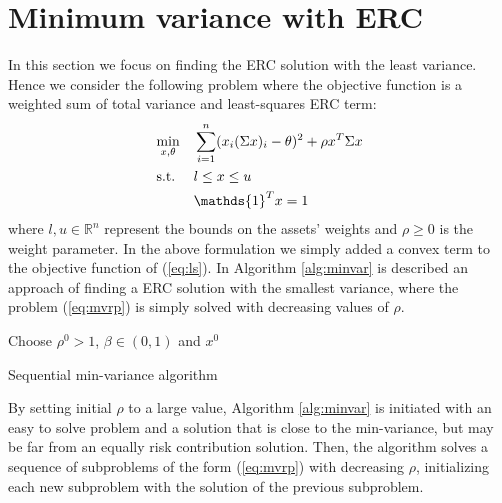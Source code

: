 {\section{Minimum variance with ERC}
In this section we focus on finding the ERC solution with the least variance. Hence we consider the following problem where the objective function is a weighted sum of total variance and least-squares ERC term\footnotemark[3]:
\begin{equation}\label{eq:mvrp}
\begin{aligned}
& \underset{x,\theta}{\text{min}}
&&\sum_{i=1}^n (x_i(\Sigma x)_i - \theta)^2 + \rho x^T \Sigma x\\
& \text{s.t.}
&&l \leq x \leq u\vspace{0.5em}\\
&&&\mathds{1}^T x = 1
\end{aligned}
\end{equation}
where $l,u \in \mathbb{R}^n$ represent the bounds on the assets' weights and $\rho \geq 0$ is the weight parameter. In the above formulation we simply added a convex term to the objective function of (\ref{eq:ls}). In Algorithm \ref{alg:minvar} is described an approach of finding a ERC solution with the smallest variance, where the problem (\ref{eq:mvrp}) is simply solved with decreasing values of $\rho$.

\begin{algorithm}
Choose $\rho^0 > 1$, $\beta \in (0,1)$ and $x^0 $\\
\caption{Sequential min-variance algorithm}
\label{alg:minvar}
\end{algorithm}


By setting initial $\rho$ to a large value, Algorithm \ref{alg:minvar} is initiated with an easy to solve problem and a solution that is close to the min-variance, but may be far from an equally risk contribution solution. Then, the algorithm solves a sequence of subproblems of the form (\ref{eq:mvrp}) with decreasing $\rho$, initializing each new subproblem with the solution of the previous subproblem.

}
